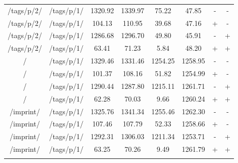 \begin{appendix}
\begin{center}
\begin{longtable}{cccccccc}
/tags/p/2/ & /tags/p/1/ & 1320.92 & 1339.97 & 75.22 & 47.85 & - & - \\
/tags/p/2/ & /tags/p/1/ & 104.13 & 110.95 & 39.68 & 47.16 & + & - \\
/tags/p/2/ & /tags/p/1/ & 1286.68 & 1296.70 & 49.80 & 45.91 & - & + \\
/tags/p/2/ & /tags/p/1/ & 63.41 & 71.23 & 5.84 & 48.20 & + & + \\
\hline
\hline
/ & /tags/p/1/ & 1329.46 & 1331.46 & 1254.25 & 1258.95 & - & - \\
/ & /tags/p/1/ & 101.37 & 108.16 & 51.82 & 1254.99 & + & - \\
/ & /tags/p/1/ & 1290.44 & 1287.80 & 1215.11 & 1261.71 & - & + \\
/ & /tags/p/1/ & 62.28 & 70.03 & 9.66 & 1260.24 & + & + \\
\hline
/imprint/ & /tags/p/1/ & 1325.76 & 1341.34 & 1255.46 & 1262.30 & - & - \\
/imprint/ & /tags/p/1/ & 107.46 & 107.79 & 52.33 & 1258.66 & + & - \\
/imprint/ & /tags/p/1/ & 1292.31 & 1306.03 & 1211.34 & 1253.71 & - & + \\
/imprint/ & /tags/p/1/ & 63.25 & 70.26 & 9.49 & 1261.79 & + & + \\
\hline
\label{tab:selenium_results_local}
\end{longtable}
\end{center}

\newpage{}


\end{appendix}

